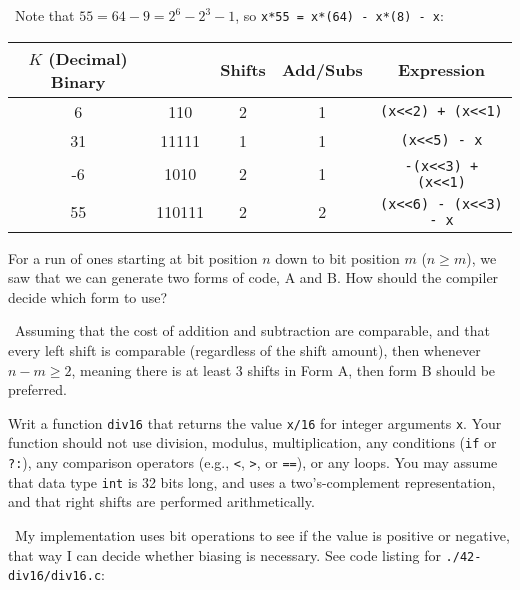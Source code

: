 \documentclass[12pt]{article}
\newenvironment{ex}[2][Exercise]{\begin{trivlist}
		\item[\hskip \labelsep {\bfseries #1}\hskip \labelsep {\bfseries #2.}]}{\end{trivlist}}
\newenvironment{sol}[1][Solution]{\begin{trivlist}
		\item[\hskip \labelsep {\bfseries #1:}]}{\end{trivlist}}
\begin{document}
\begin{sol}
	\
	Note that $55=64-9=2^6-2^3-1$, so \texttt{x*55 = x*(64) - x*(8) - x}:
	\begin{center}
		\begin{tabular}{ccccc}
			$K$ (Decimal) Binary & & Shifts & Add/Subs & Expression\\
			\hline
			6 & 110 & 2 & 1 & \texttt{(x<<2) + (x<<1)}\\
			31 & 11111  & 1 & 1 & \texttt{(x<<5) - x}\\
			-6 & 1010 & 2 & 1 & \texttt{-(x<<3) + (x<<1)}\\
			55 & 110111 & 2 & 2 & \texttt{(x<<6) - (x<<3) - x}
		\end{tabular}
	\end{center}
\end{sol}

\begin{ex}{2.41}
	For a run of ones starting at bit position $n$ down to bit position $m$ ($n\geq m$), we
	saw that we can generate two forms of code, A and B. How should the compiler decide
	which form to use?
\end{ex}

\begin{sol}
	\
	Assuming that the cost of addition and subtraction are comparable, and that every
	left shift is comparable (regardless of the shift amount), then whenever
	$n-m\geq 2$, meaning there is at least 3 shifts in Form A, then form B should
	be preferred.
\end{sol}

\begin{ex}{2.42}
	Writ a function \texttt{div16} that returns the value \texttt{x/16} for integer
	arguments \texttt{x}. Your function should not use division, modulus, multiplication,
	any conditions (\texttt{if} or \texttt{?:}), any comparison operators (e.g., \texttt{<},
	\texttt{>}, or \texttt{==}), or any loops. You may assume that data type \texttt{int}
	is 32 bits long, and uses a two's-complement representation, and that right shifts
	are performed arithmetically.
\end{ex}

\begin{sol}
	\
	My implementation uses bit operations to see if the value is positive or negative, that
	way I can decide whether biasing is necessary. See code listing for \texttt{./42-div16/div16.c}:
	
\end{sol}
\end{document}
